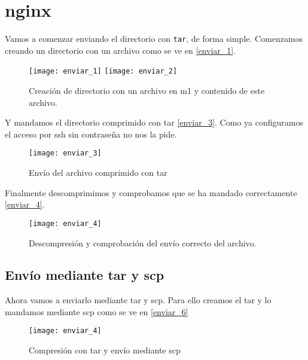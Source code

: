


\chapter{nginx}

Vamos a comenzar enviando el directorio con \verb|tar|, de forma simple. Comenzamos creando un directorio con un archivo como se ve en \eqref{enviar_1}.

\begin{figure}[h!]
\begin{center}
\caption{Creación de directorio con un archivo en m1 y contenido de este archivo.}
\label{enviar_1}
\texttt{[image: enviar\_1]}
\texttt{[image: enviar\_2]}
\end{center}
\end{figure}

Y mandamos el directorio comprimido con tar \eqref{enviar_3}. Como ya configuramos el acceso por ssh sin contraseña no nos la pide.

\begin{figure}[h!]
\begin{center}
\caption{Envío del archivo comprimido con tar}
\label{enviar_3}
\texttt{[image: enviar\_3]}
\end{center}
\end{figure}

Finalmente descomprimimos y comprobamos que se ha mandado correctamente \eqref{enviar_4}.

\begin{figure}[h!]
\begin{center}
\caption{Descompresión y comprobación del envío correcto del archivo.}
\label{enviar_4}
\texttt{[image: enviar\_4]}
\end{center}
\end{figure}

\section{Envío mediante tar y scp}

Ahora vamos a enviarlo mediante tar y scp. Para ello creamos el tar y lo mandamos mediante scp como se ve en \eqref{enviar_6}

\begin{figure}[h!]
\begin{center}
\caption{Compresión con tar y envío mediante scp}
\label{enviar_6}
\texttt{[image: enviar\_4]}
\end{center}
\end{figure}

